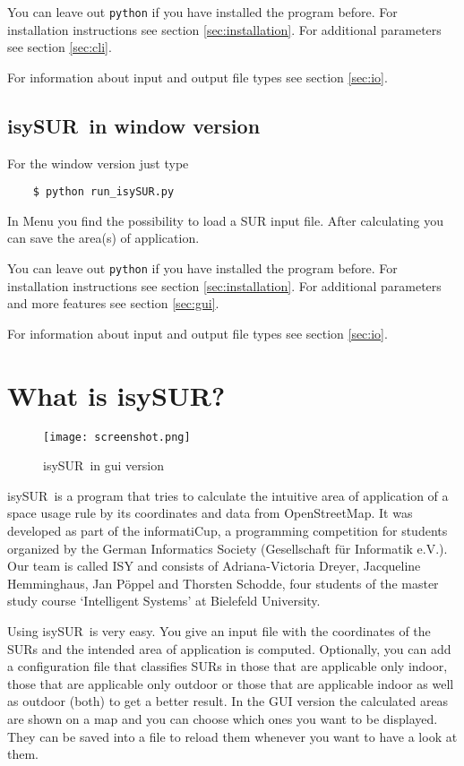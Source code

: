 \documentclass[11pt,fleqn]{book} %
\newcommand{\ProjectTitle}{isySUR}
\newcommand{\pt}{\ProjectTitle}
\begin{document}
You can leave out \texttt{python} if you have installed the program before. For installation instructions see section \ref{sec:installation}. For additional parameters see section \ref{sec:cli}.

For information about input and output file types see section \ref{sec:io}.

\subsection{\ProjectTitle\ in window version}\label{sec:QuickstartWindow}
For the window version just type
\begin{verbatim}
	$ python run_isySUR.py
\end{verbatim}
In Menu you find the possibility to load a SUR input file. After calculating you can save the area(s) of application.

You can leave out \texttt{python} if you have installed the program before. For installation instructions see section \ref{sec:installation}. For additional parameters and more features see section \ref{sec:gui}.

For information about input and output file types see section \ref{sec:io}.

\section{What is \ProjectTitle?}\label{sec:whatFor}
\begin{figure}
\centering
\texttt{[image: screenshot.png]}
\caption{\pt\ in gui version}
\end{figure}
\pt\ is a program that tries to calculate the intuitive area of application of a space usage rule by its coordinates and data from OpenStreetMap. %
It was developed as part of the informatiCup, a programming competition for students organized by the German Informatics Society (Gesellschaft für Informatik e.V.). Our team is called ISY and consists of Adriana-Victoria Dreyer, Jacqueline Hemminghaus, Jan Pöppel and Thorsten Schodde, four students of the master study course `Intelligent Systems' at Bielefeld University.

Using \pt\ is very easy. You give an input file with the coordinates of the SURs and the intended area of application is computed. Optionally, you can add a configuration file that classifies SURs in those that are applicable only indoor, those that are applicable only outdoor or those that are applicable indoor as well as outdoor (both) to get a better result. In the GUI version the calculated areas are shown on a map and you can choose which ones you want to be displayed. They can be saved into a file to reload them whenever you want to have a look at them.
\end{document}
